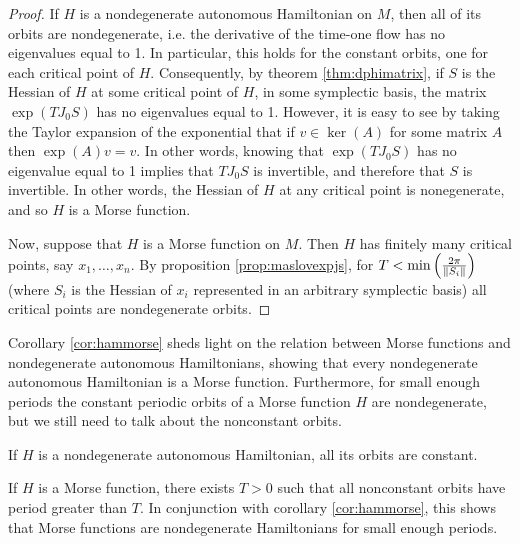 \begin{proof}
If $H$ is a nondegenerate autonomous Hamiltonian on $M$, then all of its orbits are nondegenerate, i.e. the derivative of the time-one flow has no eigenvalues equal to 1. In particular, this holds for the constant orbits, one for each critical point of $H$. Consequently, by theorem \ref{thm:dphimatrix}, if $S$ is the Hessian of $H$ at some critical point of $H$, in some symplectic basis, the matrix $\exp(T J_0 S)$ has no eigenvalues equal to 1. However, it is easy to see by taking the Taylor expansion of the exponential that if $v \in \ker(A)$ for some matrix $A$ then $\exp(A) v = v$. In other words, knowing that $\exp(T J_0 S)$ has no eigenvalue equal to 1 implies that $T J_0 S$ is invertible, and therefore that $S$ is invertible. In other words, the Hessian of $H$ at any critical point is nonegenerate, and so $H$ is a Morse function.

Now, suppose that $H$ is a Morse function on $M$. Then $H$ has finitely many critical points, say $x_1, \dots, x_n$. By proposition \ref{prop:maslovexpjs}, for $T < \min\left(\frac{2\pi}{\lVert S_i\rVert}\right)$ (where $S_i$ is the Hessian of $x_i$ represented in an arbitrary symplectic basis) all critical points are nondegenerate orbits.
\end{proof}

Corollary \ref{cor:hammorse} sheds light on the relation between Morse functions and nondegenerate autonomous Hamiltonians, showing that every nondegenerate autonomous Hamiltonian is a Morse function. Furthermore, for small enough periods the constant periodic orbits of a Morse function $H$ are nondegenerate, but we still need to talk about the nonconstant orbits.

\begin{prop}\label{prop:nonconstantorbits}
If $H$ is a nondegenerate autonomous Hamiltonian, all its orbits are constant.

If $H$ is a Morse function, there exists $T>0$ such that all nonconstant orbits have period greater than $T$. In conjunction with corollary \ref{cor:hammorse}, this shows that Morse functions are nondegenerate Hamiltonians for small enough periods.
\end{prop}


